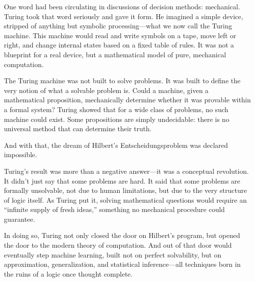 One word had been circulating in discussions of decision methods: mechanical. Turing took that word seriously and gave it form. He imagined a simple device, stripped of anything but symbolic processing—what we now call the Turing machine. This machine would read and write symbols on a tape, move left or right, and change internal states based on a fixed table of rules. It was not a blueprint for a real device, but a mathematical model of pure, mechanical computation.

The Turing machine was not built to solve problems. It was built to define the very notion of what a solvable problem is. Could a machine, given a mathematical proposition, mechanically determine whether it was provable within a formal system? Turing showed that for a wide class of problems, no such machine could exist. Some propositions are simply undecidable: there is no universal method that can determine their truth.

And with that, the dream of Hilbert’s Entscheidungsproblem was declared impossible.

Turing's result was more than a negative answer—it was a conceptual revolution. It didn’t just say that some problems are hard. It said that some problems are formally unsolvable, not due to human limitations, but due to the very structure of logic itself. As Turing put it, solving mathematical questions would require an “infinite supply of fresh ideas,” something no mechanical procedure could guarantee.

In doing so, Turing not only closed the door on Hilbert’s program, but opened the door to the modern theory of computation. And out of that door would eventually step machine learning, built not on perfect solvability, but on approximation, generalization, and statistical inference—all techniques born in the ruins of a logic once thought complete.

